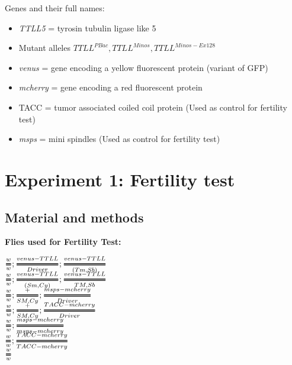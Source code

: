 \documentclass{article}
\newcommand{\Tfrac}[2]{%
	\ooalign{%
		$\genfrac{}{}{2.5pt}1{#1}{#2}$\cr%
		$\color{white}\genfrac{}{}{.8pt}1{\phantom{#1}}{\phantom{#2}}$}%
}
\begin{document}
Genes and their full names:\\

\begin{itemize}
	\item \textit{TTLL5} = tyrosin tubulin ligase like 5
	\item Mutant alleles $\textit{TTLL}^{PBac}, \textit{TTLL}^{Minos}, \textit{TTLL}^{Minos-Ex128} $
	\item \textit{venus} = gene encoding a yellow fluorescent protein (variant of GFP)
	\item \textit{mcherry} = gene encoding a red fluorescent protein
	\item TACC = tumor associated coiled coil protein (Used as control for fertility test)
	\item \textit{msps} = mini spindles (Used as control for fertility test)
\end{itemize}

\newpage
\section*{Experiment 1: Fertility test}
\subsection*{Material and methods}

\textbf{Flies used for Fertility Test:}\\

\begin{multicols}{2}
	\begin{Large}
			$\Tfrac{w}{w}; \Tfrac{venus-TTLL}{Driver}; \Tfrac{venus-TTLL}{(Tm, Sb)}$\\
			
			$\Tfrac{w}{w}; \Tfrac{venus-TTLL}{(Sm, Cy)}; \Tfrac{venus-TTLL}{TM, Sb}$\\
			
			$\Tfrac{w}{w};\Tfrac{+}{SM, Cy} ; \Tfrac{msps-mcherry}{Driver}$\\
			
			$\Tfrac{w}{w};\Tfrac{+}{SM, Cy} ; \Tfrac{TACC-mcherry}{Driver}$\\
			
			$\Tfrac{w}{w}; \Tfrac{msps-mcherry}{msps-mcherry}$\\
			
			$\Tfrac{w}{w}; \Tfrac{TACC-mcherry}{TACC-mcherry}$\\
			
			$\Tfrac{w}{w}$\\
			
	\end{Large}
\end{multicols}
\end{document}
